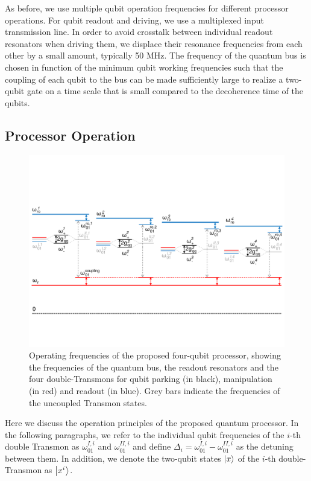 \smallskip

As before, we use multiple qubit operation frequencies for different processor operations. For qubit readout and driving, we use a multiplexed input transmission line. In order to avoid crosstalk between individual readout resonators when driving them, we displace their resonance frequencies from each other by a small amount, typically 50 MHz. The frequency of the quantum bus is chosen in function of the minimum qubit working frequencies such that the coupling of each qubit to the bus can be made sufficiently large to realize a two-qubit gate on a time scale that is small compared to the decoherence time of the qubits. 

\subsection{Processor Operation}

\begin{figure}[ht!]
	\centering
	\includegraphics[width=\textwidth]{./material/figures/scalable-architecture/qubit_architecture_energy_levels}
	\caption[]{Operating frequencies of the proposed four-qubit processor, showing the frequencies of the quantum bus, the readout resonators and the four double-Transmons for qubit parking (in black), manipulation (in red) and readout (in blue). Grey bars indicate the frequencies of the uncoupled Transmon states.}
	\label{fig:scalable_architecture_energy_levels}
\end{figure}

Here we discuss the operation principles of the proposed quantum processor. In the following paragraphs, we refer to the individual qubit frequencies of the $i$-th double Transmon as $\omega_{01}^{I,i}$ and $\omega_{01}^{II,i}$ and define $\Delta_i = \omega_{01}^{I,i}-\omega_{01}^{II,i}$ as the detuning between them. In addition, we denote the two-qubit states $\left| x \right>$ of the $i$-th double-Transmon as $\left| x^i \right>$. 


